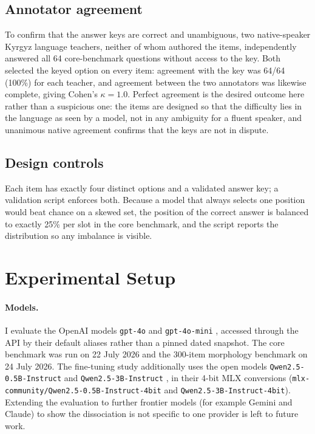 \documentclass[11pt]{article}
\begin{document}
\subsection{Annotator agreement}

To confirm that the answer keys are correct and unambiguous, two native-speaker Kyrgyz
language teachers, neither of whom authored the items, independently answered all 64
core-benchmark questions without access to the key. Both selected the keyed option on
every item: agreement with the key was 64/64 (100\%) for each teacher, and agreement
between the two annotators was likewise complete, giving Cohen's $\kappa = 1.0$.
Perfect agreement is the desired outcome here rather than a suspicious one: the items
are designed so that the difficulty lies in the language as seen by a model, not in any
ambiguity for a fluent speaker, and unanimous native agreement confirms that the keys
are not in dispute.

\subsection{Design controls}

Each item has exactly four distinct options and a validated answer key; a validation
script enforces both. Because a model that always selects one position would beat
chance on a skewed set, the position of the correct answer is balanced to exactly
25\% per slot in the core benchmark, and the script reports the distribution so any
imbalance is visible.

\section{Experimental Setup}
\label{sec:setup}

\paragraph{Models.} I evaluate the OpenAI models \texttt{gpt-4o} and
\texttt{gpt-4o-mini} \cite{openai2023gpt4}, accessed through the API by their default
aliases rather than a pinned dated snapshot. The core benchmark was run on 22 July 2026
and the 300-item morphology benchmark on 24 July 2026. The fine-tuning study
additionally uses the open models \texttt{Qwen2.5-0.5B-Instruct} and
\texttt{Qwen2.5-3B-Instruct} \cite{qwen2025}, in their 4-bit MLX conversions
(\texttt{mlx-community/Qwen2.5-0.5B-Instruct-4bit} and \texttt{Qwen2.5-3B-Instruct-4bit}).
Extending the evaluation to further frontier models (for example Gemini and Claude) to
show the dissociation is not specific to one provider is left to future work.
\end{document}
